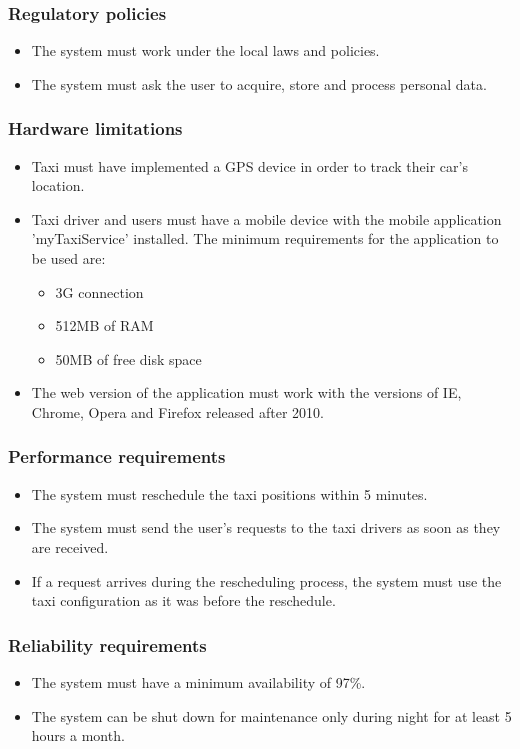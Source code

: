 \subsubsection{Regulatory policies}
	\begin{itemize}
		\item The system must work under the local laws and policies.
		\item The system must ask the user to acquire, store and process personal data. 
	\end{itemize}
	
\subsubsection{Hardware limitations}
	\begin{itemize}
		\item Taxi must have implemented a GPS device in order to track their car's location.
		\item Taxi driver and users must have a mobile device with the mobile application 'myTaxiService' installed. The minimum requirements for the application to be used are: 
		\begin{itemize}
			\item 3G connection
			\item 512MB of RAM
			\item 50MB of free disk space
		\end{itemize}
		\item The web version of the application must work with the versions of IE, Chrome, Opera and Firefox released after 2010.
	\end{itemize}

\subsubsection{Performance requirements}
	\begin{itemize}
		\item The system must reschedule the taxi positions within 5 minutes.
		\item The system must send the user's requests to the taxi drivers as soon as they are received.
		\item If a request arrives during the rescheduling process, the system must use the taxi configuration as it was before the reschedule.
	\end{itemize}

\subsubsection{Reliability requirements}
	\begin{itemize}
		\item The system must have a minimum availability of 97\%.
		\item The system can be shut down for maintenance only during night for at least 5 hours a month.
	\end{itemize}

